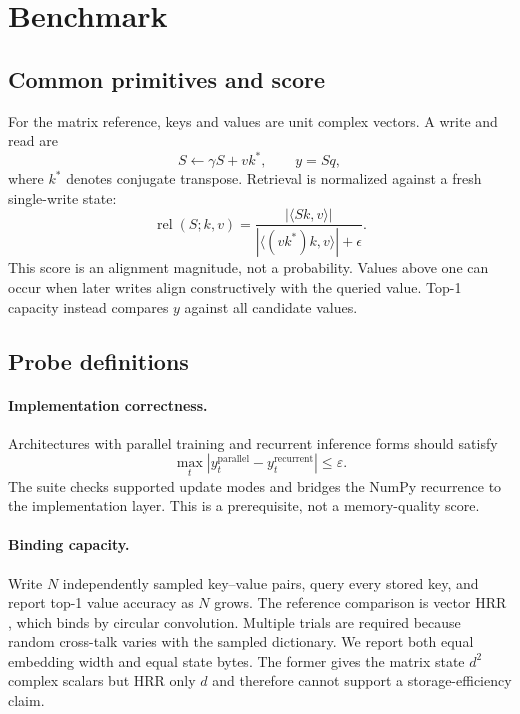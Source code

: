 \documentclass[10pt,twocolumn]{article}
\begin{document}
\section{Benchmark}
\label{sec:benchmark}

\subsection{Common primitives and score}

For the matrix reference, keys and values are unit complex vectors.  A write
and read are
\begin{equation}
  S \leftarrow \gamma S + vk^{*}, \qquad y = Sq,
  \label{eq:write-read}
\end{equation}
where $k^{*}$ denotes conjugate transpose.  Retrieval is normalized against a
fresh single-write state:
\begin{equation}
  \operatorname{rel}(S;k,v) =
  \frac{|\langle Sk,v\rangle|}
       {|\langle(vk^{*})k,v\rangle|+\epsilon}.
  \label{eq:relative}
\end{equation}
This score is an alignment magnitude, not a probability.  Values above one
can occur when later writes align constructively with the queried value.
Top-1 capacity instead compares $y$ against all candidate values.

\subsection{Probe definitions}

\paragraph{Implementation correctness.}
Architectures with parallel training and recurrent inference forms should
satisfy
\begin{equation}
  \max_t \left|y_t^{\mathrm{parallel}}-
                    y_t^{\mathrm{recurrent}}\right| \leq \varepsilon.
\end{equation}
The suite checks supported update modes and bridges the NumPy recurrence to
the implementation layer.  This is a prerequisite, not a memory-quality
score.

\paragraph{Binding capacity.}
Write $N$ independently sampled key--value pairs, query every stored key, and
report top-1 value accuracy as $N$ grows.  The reference comparison is vector
HRR \cite{plate1995hrr}, which binds by circular convolution.  Multiple trials
are required because random cross-talk varies with the sampled dictionary.
We report both equal embedding width and equal state bytes.  The former gives
the matrix state $d^2$ complex scalars but HRR only $d$ and therefore cannot
support a storage-efficiency claim.
\end{document}
